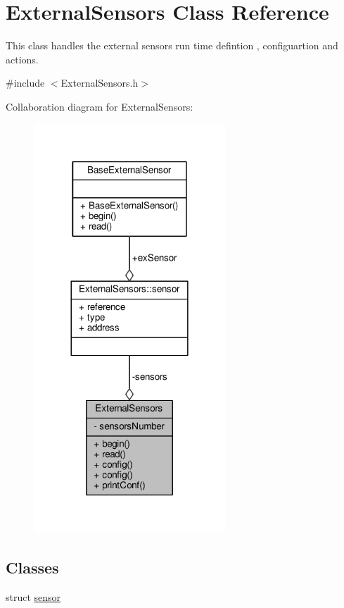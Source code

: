 \hypertarget{class_external_sensors}{}\section{External\+Sensors Class Reference}
\label{class_external_sensors}


This class handles the external sensors run time defintion , configuartion and actions.  




{\ttfamily \#include $<$External\+Sensors.\+h$>$}



Collaboration diagram for External\+Sensors\+:\nopagebreak
\begin{figure}[H]
\begin{center}
\leavevmode
\includegraphics[width=204pt]{d8/df9/class_external_sensors__coll__graph}
\end{center}
\end{figure}
\subsection*{Classes}
\begin{DoxyCompactItemize}
\item 
struct \hyperlink{struct_external_sensors_1_1sensor}{sensor}
\end{DoxyCompactItemize}
